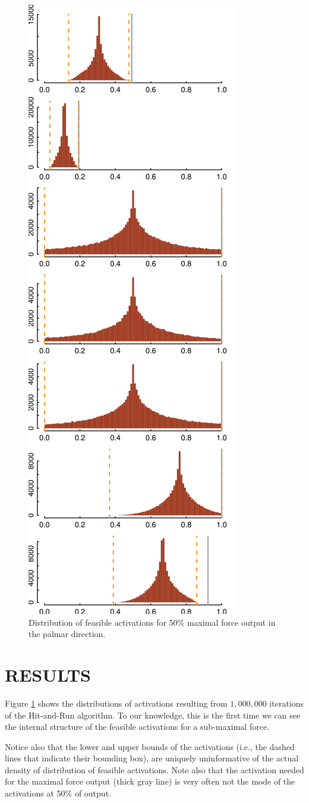 \begin{figure}[htbp]
\centering
\includegraphics[width=7.5cm\textwidth]{sections/figs/raw_histograms.png}
\caption{Distribution of feasible activations for 50\% maximal force output in the palmar direction.}
\label{fig:raw_histograms}
\end{figure}


\section{RESULTS}

Figure \ref{fig:raw_histograms} shows the distributions of activations resulting from $1,000,000$ iterations of the Hit-and-Run algorithm. To our knowledge, this is the first time we can see the internal structure of the feasible activations for a sub-maximal force.

Notice also that the lower and upper bounds of the activations (i.e., the dashed lines that indicate their bounding box), are uniquely uninformative of the actual density of distribution of feasible activations. Note also that the activation needed for the maximal force output (thick gray line) is very often not the mode of the activations at 50\% of output.

